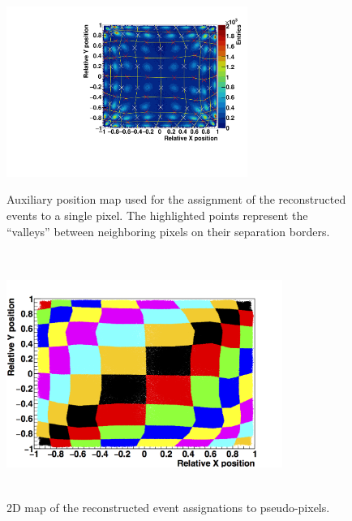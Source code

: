\begin{figure} [!h]
\centering
\includegraphics[width=0.7\textwidth]{03_GraphicFiles/chapter3_CLaRySproto/Absorber/images_charResults_Co60/3_Cal_FLOODMAP_averPoints.pdf}\\
\caption{Auxiliary position map used for the assignment of the reconstructed events to a single pixel. The highlighted points represent the \enquote{valleys} between neighboring pixels on their separation borders.}
\label{chap3::fig::absavPosMap}
\end{figure}

\begin{figure}
\centering
\includegraphics[width=9cm, height= 8cm]{03_GraphicFiles/chapter3_CLaRySproto/Absorber/images_charResults_Na22/3_2PixelAssignment.png}
\caption{2D map of the reconstructed event assignations to pseudo-pixels.}
\label{chap3::fig::abspixAssCheck}
\end{figure}


